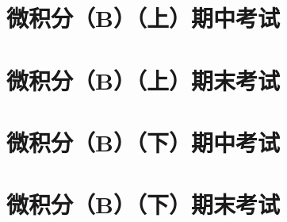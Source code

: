 \documentclass[A4,10pt,twoside]{book}
\begin{document}
\frontmatter
{}


\restoregeometry




% 
\mainmatter
\part{微积分（B）（上）期中考试}
















\part{微积分（B）（上）期末考试}








\part{微积分（B）（下）期中考试}









\part{微积分（B）（下）期末考试}










% 
% 
% 
\end{document}
